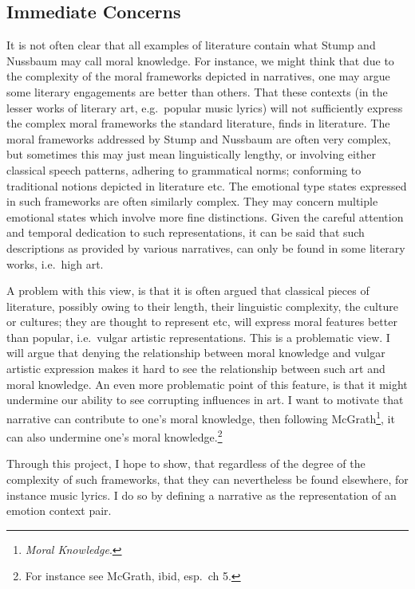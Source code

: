 \documentclass[phdthesis,12pt,final,a4paper]{wuthesis}
\theoremstyle{definition}
\theoremstyle{definition}
\theoremstyle{definition}
\theoremstyle{definition}
\theoremstyle{remark}
\begin{document}
\subsection*{Immediate Concerns}\label{immediate-concerns}

It is not often clear that all examples of literature contain what Stump and Nussbaum may call moral knowledge. For instance, we might think that due to the complexity of the moral frameworks depicted in narratives, one may argue some literary engagements are better than others. That these contexts (in the lesser works of literary art, e.g.~popular music lyrics) will not sufficiently express the complex moral frameworks the standard literature, finds in literature. The moral frameworks addressed by Stump and Nussbaum are often very complex, but sometimes this may just mean linguistically lengthy, or involving either classical speech patterns, adhering to grammatical norms; conforming to traditional notions depicted in literature etc. The emotional type states expressed in such frameworks are often similarly complex. They may concern multiple emotional states which involve more fine distinctions. Given the careful attention and temporal dedication to such representations, it can be said that such descriptions as provided by various narratives, can only be found in some literary works, i.e.~high art.

A problem with this view, is that it is often argued that classical pieces of literature, possibly owing to their length, their linguistic complexity, the culture or cultures; they are thought to represent etc, will express moral features better than popular, i.e.~vulgar artistic representations. This is a problematic view. I will argue that denying the relationship between moral knowledge and vulgar artistic expression makes it hard to see the relationship between such art and moral knowledge. An even more problematic point of this feature, is that it might undermine our ability to see corrupting influences in art. I want to motivate that narrative can contribute to one's moral knowledge, then following McGrath\footnote{\emph{Moral {Knowledge}}.}, it can also undermine one's moral knowledge.\footnote{For instance see McGrath, ibid, esp.~ch 5.}

Through this project, I hope to show, that regardless of the degree of the complexity of such frameworks, that they can nevertheless be found elsewhere, for instance music lyrics. I do so by defining a narrative as the representation of an emotion context pair.
\end{document}
